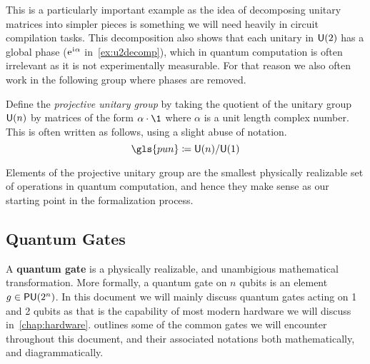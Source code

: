 This is a particularly important example as the idea of decomposing unitary matrices into simpler pieces is something we will need heavily in circuit compilation tasks.
This decomposition also shows that each unitary in $\mathsf{U} (2)$ has a global phase ($\mathrm{e}^{\mkern1mu\mathrm{i}\mkern1mu\alpha}$ in~\cref{ex:u2decomp}), which in quantum computation is often irrelevant as it is not experimentally measurable. %
For that reason we also often work in the following group where phases are removed.
\begin{definition}
    Define the \emph{projective unitary group} by taking the quotient of the unitary group $\mathsf{U} (n)$ by matrices of the form $\alpha \cdot \1$ where $\alpha$ is a unit length complex number.
    This is often written as follows, using a slight abuse of notation.
    \begin{equation}
        \gls{pun} \defeq \U{n} / \U{1}
    \end{equation}
\end{definition}
Elements of the projective unitary group are the smallest physically realizable set of operations in quantum computation, and hence they make sense as our starting point in the formalization process.

\subsection{Quantum Gates}

A \textbf{quantum gate} is a physically realizable, and unambigious mathematical transformation.
More formally, a quantum gate on $n$ qubits is an element $g \in \mathsf{PU} (2^n)$.
In this document we will mainly discuss quantum gates acting on 1 and 2 qubits as that is the capability of most modern hardware we will discuss in~\cref{chap:hardware}.
 outlines some of the common gates we will encounter throughout this document, and their associated notations both mathematically, and diagrammatically.

